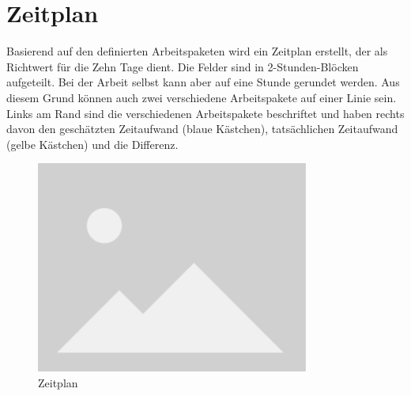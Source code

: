 \chapter{Zeitplan}\label{ch:zeitplan}
Basierend auf den definierten Arbeitspaketen wird ein Zeitplan erstellt, der als Richtwert für die Zehn Tage dient. Die Felder sind in 2-Stunden-Blöcken aufgeteilt. Bei der Arbeit selbst kann aber auf eine Stunde gerundet werden. Aus diesem Grund können auch zwei verschiedene Arbeitspakete auf einer Linie sein. Links am Rand sind die verschiedenen Arbeitspakete beschriftet und haben rechts davon den geschätzten Zeitaufwand (blaue Kästchen), tatsächlichen Zeitaufwand (gelbe Kästchen) und die Differenz.

\begin{figure}[H]
	\begin{center}
		\includegraphics[width=0.8\textwidth]{ressourcen/placeholder}
		\caption[Zeitplan]{Zeitplan}\label{fig:zeitplan}
	\end{center}
\end{figure}
